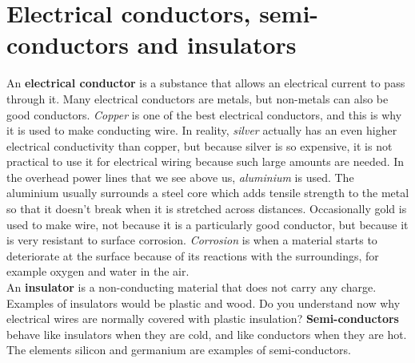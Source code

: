 



\section{Electrical conductors, semi-conductors and insulators}
\label{sec:cm:ecsc}

An \textbf{electrical conductor} is a substance that allows an electrical current to pass through it. Many electrical conductors are metals, but non-metals can also be good conductors. \textit{Copper} is one of the best electrical conductors, and this is why it is used to make conducting wire. In reality, \textit{silver} actually has an even higher electrical conductivity than copper, but because silver is so expensive, it is not practical to use it for electrical wiring because such large amounts are needed. In the overhead power lines that we see above us, \textit{aluminium} is used. The aluminium usually surrounds a steel core which adds tensile strength to the metal so that it doesn't break when it is stretched across distances. Occasionally gold is used to make wire, not because it is a particularly good conductor, but because it is very resistant to surface corrosion. \textit{Corrosion} is when a material starts to deteriorate at the surface because of its reactions with the surroundings, for example oxygen and water in the air.\\

An \textbf{insulator} is a non-conducting material that does not carry any charge. Examples of insulators would be plastic and wood. Do you understand now why electrical wires are normally covered with plastic insulation? \textbf{Semi-conductors} behave like insulators when they are cold, and like conductors when they are hot. The elements silicon and germanium are examples of semi-conductors.



